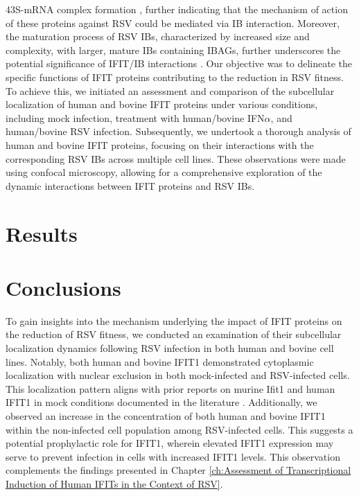 43S-mRNA complex formation \cite{Diamond2014IFIT1:Translation, Guo2000CharacterizationVirus}, further indicating that the mechanism of action of these proteins against RSV could be mediated via IB interaction. Moreover, the maturation process of RSV IBs, characterized by increased size and complexity, with larger, mature IBs containing IBAGs, further underscores the potential significance of IFIT/IB interactions \cite{Rincheval2017FunctionalVirus, Jobe2021BovineResponses}. Our objective was to delineate the specific functions of IFIT proteins contributing to the reduction in RSV fitness. To achieve this, we initiated an assessment and comparison of the subcellular localization of human and bovine IFIT proteins under various conditions, including mock infection, treatment with human/bovine IFN\(\alpha\), and human/bovine RSV infection. Subsequently, we undertook a thorough analysis of human and bovine IFIT proteins, focusing on their interactions with the corresponding RSV IBs across multiple cell lines. These observations were made using confocal microscopy, allowing for a comprehensive exploration of the dynamic interactions between IFIT proteins and RSV IBs.

\section{Results} \label{sec:Results-Chapter3}



\section{Conclusions} \label{sec:Conclusions-Chapter3}
To gain insights into the mechanism underlying the impact of IFIT proteins on the reduction of RSV fitness, we conducted an examination of their subcellular localization dynamics following RSV infection in both human and bovine cell lines. Notably, both human and bovine IFIT1 demonstrated cytoplasmic localization with nuclear exclusion in both mock-infected and RSV-infected cells. This localization pattern aligns with prior reports on murine Ifit1 and human IFIT1 in mock conditions documented in the literature \cite{Pichlmair2011IFIT1RNA, Terenzi2008Interferon-inducibleE1, Thul2017AProteome}. Additionally, we observed an increase in the concentration of both human and bovine IFIT1 within the non-infected cell population among RSV-infected cells. This suggests a potential prophylactic role for IFIT1, wherein elevated IFIT1 expression may serve to prevent infection in cells with increased IFIT1 levels. This observation complements the findings presented in Chapter \ref{ch:Assessment of Transcriptional Induction of Human IFITs in the Context of RSV}.

